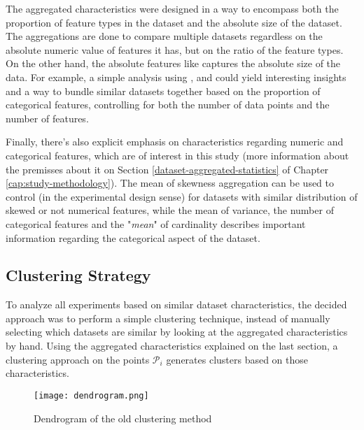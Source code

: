 The aggregated characteristics were designed in a way to encompass both the proportion of feature types in the dataset and the absolute size of the dataset. The  aggregations are done to compare multiple datasets regardless on the absolute numeric value of features it has, but on the ratio of the feature types. On the other hand, the absolute features like  captures the absolute size of the data. For example, a simple analysis using ,  and  could yield interesting insights and a way to bundle similar datasets together based on the proportion of categorical features, controlling for both the number of data points and the number of features. 

Finally, there's also explicit emphasis on characteristics regarding numeric and categorical features, which are of interest in this study (more information about the premisses about it on Section \ref{dataset-aggregated-statistics} of Chapter \ref{cap:study-methodology}). The mean of skewness aggregation can be used to control (in the experimental design sense) for datasets with similar distribution of skewed or not numerical features, while the mean of variance, the number of categorical features and the "\textit{mean}" of cardinality describes important information regarding the categorical aspect of the dataset.  

\subsection{Clustering Strategy}

To analyze all experiments based on similar dataset characteristics, the decided approach was to perform a simple clustering technique, instead of manually selecting which datasets are similar by looking at the aggregated characteristics by hand. Using the aggregated characteristics explained on the last section, a clustering approach on the points $\mathcal{P}_i$ generates clusters based on those characteristics.

\begin{figure}[!h]
    \centering
    \texttt{[image: dendrogram.png]}
    \caption{Dendrogram of the old clustering method}
    \label{fig:dendrogram}
\end{figure}

